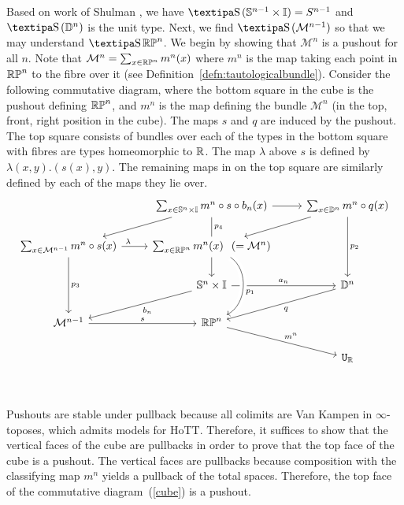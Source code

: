 \documentclass{amsart}
\begin{document}
Based on work of Shulman \cite{shul:bfp}, we have $\shape(\set{S}^{n-1} \times \set{I}) =S^{n-1}$ and $\shape (\set{D}^{n})$ is the unit type. Next, we find $\shape (\mathcal{M}^{n-1})$ so that we may understand $ \shape \set{RP}^n$.  We begin by showing that $\mathcal{M}^{n}$ is a pushout for all $n$. Note that $\mathcal{M}^n= \sum _{x \in \mathbb{RP}^n} m^n (x)$ where $m^n$ is the map taking each point in $\mathbb{RP}^n$ to the fibre over it (see Definition~\ref{defn:tautologicalbundle}). Consider the following commutative diagram, where the bottom square in the cube is the pushout defining $\mathbb{RP}^n$, and $m^n$ is the map defining the bundle  $ \mathcal{M}^{n}$ (in the top, front, right position in the cube). The maps $s$ and $q$ are induced by the pushout. The top square consists of bundles over each of the types in the bottom square with fibres are types homeomorphic to $\mathbb{R}$. The map $\lambda$ above $s$ is defined by $\lambda (x,y). (s(x),y)$. The remaining maps in on the top square are similarly defined by each of the maps they lie over. \\
\begin{equation}
\begin{tikzcd}
																				& \sum_{x \in \set{S}^n \times \set{I}} m^n \circ s \circ b_n (x) \arrow[r]	\arrow[ld] \arrow[-, d, "p_4"] 	& \sum_{x \in \set{D}^n} m^n \circ q (x) \arrow[ld] \arrow[dd, "p_2"]\\
\sum_{x \in \mathcal{M}^{n-1}}  m^n \circ s (x) \arrow[r, crossing over, near start, "\lambda"] \arrow[dd, "p_3"]	& \sum_{x \in \set{RP}^n}m^n(x)\hspace{0.25cm} (=\mathcal{M}^n)	\arrow[d]								&	\\
																				& \set{S}^n \times \set{I} \arrow[r, "a_n"] \arrow[ld, "b_n"]										& \set{D}^n \arrow [ld, "q"]\\
\mathcal{M}^{n-1} \arrow[r, "s" ]															& \set{RP}^n \ar[rd, "m^n"] 																	& \\
																				&																						& \U_{\set{R}}\\
\arrow[from=2-2, to=4-2, crossing over, bend left = 60, "p_1"]
\end{tikzcd}
\label{cube}
\end{equation}

Pushouts are stable under pullback because all colimits are Van Kampen in $\infty$-toposes, which admits models for HoTT. Therefore, it suffices to show that the vertical faces of the cube are pullbacks in order to prove that the top face of the cube is a pushout. The vertical faces are pullbacks because composition with the classifying map $m^n$ yields a pullback of the total spaces. Therefore, the top face of the commutative diagram~(\ref{cube}) is a pushout.
\end{document}

